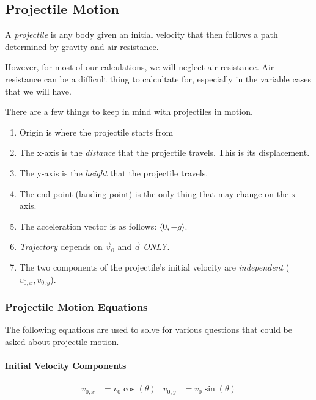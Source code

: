\subsection{Projectile Motion} \label{subsec:Projectile Motion}
\begin{definition}[Projectile] \label{def:Projectile}
  A \emph{projectile} is any body given an initial velocity that then follows a path determined by gravity and air resistance.
  \begin{remark}
    However, for most of our calculations, we will neglect air resistance.
    Air resistance can be a difficult thing to calcultate for, especially in the variable cases that we will have.
  \end{remark}
\end{definition}

There are a few things to keep in mind with projectiles in motion.
\begin{enumerate}
  \item Origin is where the projectile starts from
  \item The x-axis is the \emph{distance} that the projectile travels. This is its displacement.
  \item The y-axis is the \emph{height} that the projectile travels.
  \item The end point (landing point) is the only thing that may change on the x-axis.
  \item The acceleration vector is as follows: $\langle 0, -g \rangle$.
  \item \emph{Trajectory} depends on $\vec{v}_{0}$ and $\vec{a}$ \emph{ONLY}.
  \item The two components of the projectile's initial velocity are \emph{independent} ($v_{0,x}, v_{0,y}$).
\end{enumerate}

\subsubsection{Projectile Motion Equations} \label{subsubsec:Projectile Motion Eqns}
The following equations are used to solve for various questions that could be asked about projectile motion.

\paragraph{Initial Velocity Components} \label{par:Projectile Initial Velocity Components}
\begin{equation} \label{eq:Projectile Initial Velocity Components}
  \begin{aligned}
    v_{0,x} &= v_{0} \cos ( \theta ) & v_{0,y} &= v_{0} \sin ( \theta ) \\
  \end{aligned}
\end{equation}

